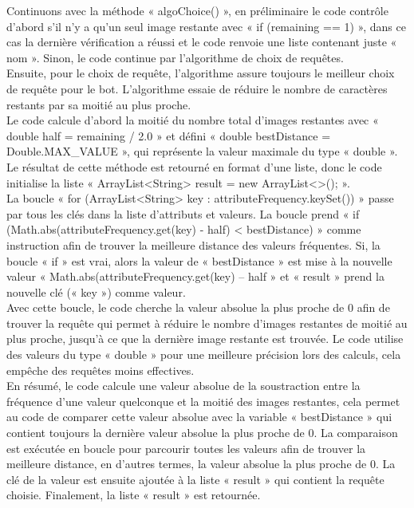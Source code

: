 \documentclass[a4paper]{article}
\begin{document}
Continuons avec la méthode « algoChoice() », en préliminaire le code contrôle d’abord s'il n'y a qu'un seul image restante avec « if (remaining == 1) », dans ce cas la dernière vérification a réussi et le code renvoie une liste contenant juste « nom ». Sinon, le code continue par l’algorithme de choix de requêtes.\\
Ensuite, pour le choix de requête, l’algorithme assure toujours le meilleur choix de requête pour le bot. L'algorithme essaie de réduire le nombre de caractères restants par sa moitié au plus proche.\\ Le code calcule d’abord la moitié du nombre total d’images restantes avec « double half = remaining / 2.0 » et défini « double bestDistance = Double.MAX\_VALUE », qui représente la valeur maximale du type « double ». Le résultat de cette méthode est retourné en format d’une liste, donc le code initialise la liste « ArrayList<String> result = new ArrayList<>(); ».\\
La boucle « for (ArrayList<String> key : attributeFrequency.keySet()) » passe par tous les clés dans la liste d’attributs et valeurs. La boucle prend « if (Math.abs(attributeFrequency.get(key) - half) < bestDistance) » comme instruction afin de trouver la meilleure distance des valeurs fréquentes. Si, la boucle « if » est vrai, alors la valeur de « bestDistance » est mise à la nouvelle valeur « Math.abs(attributeFrequency.get(key) – half » et « result » prend la nouvelle clé (« key ») comme valeur.\\
Avec cette boucle, le code cherche la valeur absolue la plus proche de 0 afin de trouver la requête qui permet à réduire le nombre d’images restantes de moitié au plus proche, jusqu’à ce que la dernière image restante est trouvée. Le code utilise des valeurs du type « double » pour une meilleure précision lors des calculs, cela empêche des requêtes moins effectives.\\

En résumé, le code calcule une valeur absolue de la soustraction entre la fréquence d’une valeur quelconque et la moitié des images restantes, cela permet au code de comparer cette valeur absolue avec la variable « bestDistance » qui contient toujours la dernière valeur absolue la plus proche de 0. La comparaison est exécutée en boucle pour parcourir toutes les valeurs afin de trouver la meilleure distance, en d'autres termes, la valeur absolue la plus proche de 0. La clé de la valeur est ensuite ajoutée à la liste « result » qui contient la requête choisie. Finalement, la liste « result » est retournée.\\
 
\end{document}
